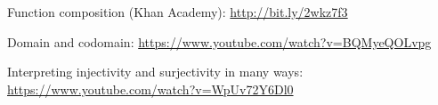 \begin{readinessAssuranceResources}
\item Function composition (Khan Academy):
      \url{http://bit.ly/2wkz7f3}
\item Domain and codomain:
\url{https://www.youtube.com/watch?v=BQMyeQOLvpg}
\item Interpreting injectivity and surjectivity in many ways:
\url{https://www.youtube.com/watch?v=WpUv72Y6Dl0}
\end{readinessAssuranceResources}

